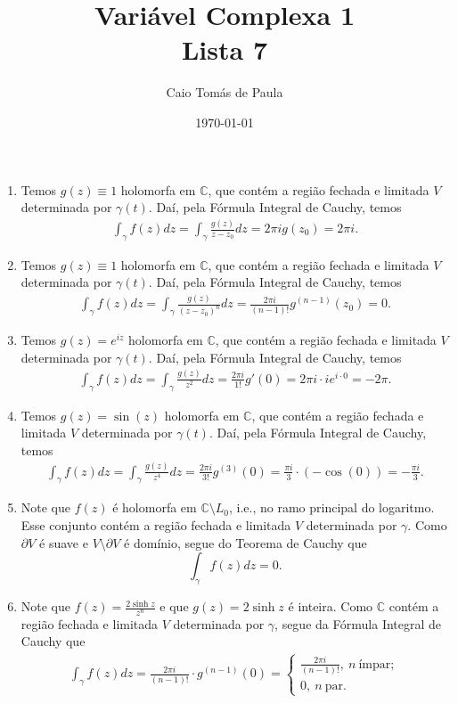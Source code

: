 \documentclass[12pt,a4paper]{article}
\title{\textbf{Variável Complexa 1}\\ Lista 7}
\author{Caio Tomás de Paula}
\date{\today}
\begin{document}
	\maketitle
	\begin{enumerate}		
		\item Temos $g(z)\equiv 1$ holomorfa em $\mathbb{C}$, que contém a região fechada e limitada $V$ determinada por $\gamma(t)$. Daí, pela Fórmula Integral de Cauchy, temos
		\begin{align*}
		\int_{\gamma} f(z) dz = \int_{\gamma}\frac{g(z)}{z-z_0}dz = 2\pi ig(z_0) = 2\pi i.
		\end{align*}
		
		\item Temos $g(z)\equiv 1$ holomorfa em $\mathbb{C}$, que contém a região fechada e limitada $V$ determinada por $\gamma(t)$. Daí, pela Fórmula Integral de Cauchy, temos
		\begin{align*}
		\int_{\gamma} f(z) dz = \int_{\gamma}\frac{g(z)}{(z-z_0)^n}dz = \frac{2\pi i}{(n-1)!}g^{(n-1)}(z_0) = 0.
		\end{align*}
		
		\item Temos $g(z)= e^{iz}$ holomorfa em $\mathbb{C}$, que contém a região fechada e limitada $V$ determinada por $\gamma(t)$. Daí, pela Fórmula Integral de Cauchy, temos
		\begin{align*}
		\int_{\gamma} f(z) dz = \int_{\gamma}\frac{g(z)}{z^2}dz = \frac{2\pi i}{1!}g'(0) = 2\pi i\cdot ie^{i\cdot 0} = -2\pi.
		\end{align*}
		
		\item Temos $g(z) = \sin(z)$ holomorfa em $\mathbb{C}$, que contém a região fechada e limitada $V$ determinada por $\gamma(t)$. Daí, pela Fórmula Integral de Cauchy, temos
		\begin{align*}
		\int_{\gamma} f(z) dz = \int_{\gamma}\frac{g(z)}{z^4}dz = \frac{2\pi i}{3!}g^{(3)}(0) = \frac{\pi i}{3}\cdot (-\cos(0)) = -\frac{\pi i}{3}.
		\end{align*}
		
		\item Note que $f(z)$ é holomorfa em $\mathbb{C}\setminus L_0$, i.e., no ramo principal do logaritmo. Esse conjunto contém a região fechada e limitada $V$ determinada por $\gamma$. Como $\partial V$ é suave e $V\setminus\partial V$ é domínio, segue do Teorema de Cauchy que 
		$$
		\int_{\gamma}f(z) dz = 0.
		$$
		
		\item Note que $f(z) = \displaystyle{ \frac{2\sinh z}{z^n}}$ e que $g(z) = 2\sinh z$ é inteira. Como $\mathbb{C}$ contém a região fechada e limitada $V$ determinada por $\gamma$, segue da Fórmula Integral de Cauchy que
		\begin{align*}
		\int_{\gamma}f(z) dz = \frac{2\pi i}{(n-1)!}\cdot g^{(n-1)}(0) = \begin{cases}
		\displaystyle{\frac{2\pi i}{(n-1)!}}, \ n \ \text{ímpar}; \\
		0, \ n \ \text{par}.
		\end{cases}
		\end{align*}
		

\end{enumerate}
\end{document}

